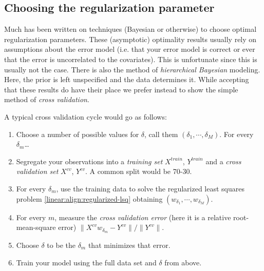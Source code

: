 \subsection{Choosing the regularization parameter}
\label{linear:subsection:cross-validation}
Much has been written on techniques (Bayesian or otherwise) to choose optimal regularization parameters.  These (asymptotic) optimality results usually rely on assumptions about the error model (i.e. that your error model is correct or ever that the error is uncorrelated to the covariates).  This is unfortunate since this is usually not the case.  There is also the method of \emph{hierarchical Bayesian} modeling.  Here, the prior is left unspecified and the data determines it.  While accepting that these results do have their place we prefer instead to show the simple method of \emph{cross validation}.  

A typical cross validation cycle would go as follows:
\begin{enumerate}
  \item Choose a number of possible values for $\delta$, call them $(\delta_1,\cdots,\delta_M)$.  For every $\delta_m$\ldots
  \item Segregate your observations into a \emph{training set} $X^{train}$, $Y^{train}$ and a \emph{cross validation set} $X^{cv}$, $Y^{cv}$.  A common split would be 70-30.
  \item For every $\delta_m$, use the training data to solve the regularized least squares problem \eqref{linear:align:regularized-lsq} obtaining $(w_{\delta_1},\cdots,w_{\delta_M})$.
  \item For every $m$, measure the \emph{cross validation error} (here it is a relative root-mean-square error) $\|X^{cv}w_{\delta_m} - Y^{cv}\|/\|Y^{cv}\|$.
  \item Choose $\delta$ to be the $\delta_m$ that minimizes that error.
  \item Train your model using the full data set and $\delta$ from above.
\end{enumerate}

